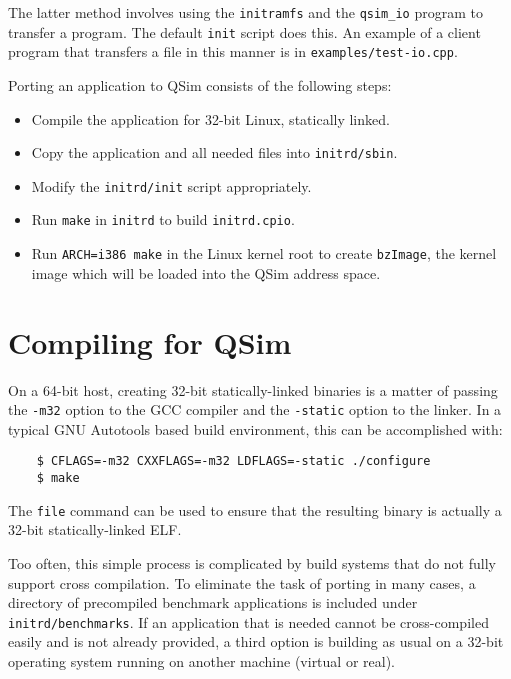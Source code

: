 \documentclass[letterpaper, 10pt]{book}
\begin{document}
The latter method involves using the \texttt{initramfs} and the
\texttt{qsim\_io} program to transfer a program. The default \texttt{init}
script does this. An example of a client program that transfers a file in this
manner is in \texttt{examples/test-io.cpp}.

Porting an application to QSim consists of the following steps:

\begin{itemize}
  \item{Compile the application for 32-bit Linux, statically linked.}
  \item{Copy the application and all needed files into \texttt{initrd/sbin}.}
  \item{Modify the \texttt{initrd/init} script appropriately.}
  \item{Run \texttt{make} in \texttt{initrd} to build \texttt{initrd.cpio}.}
  \item{Run \texttt{ARCH=i386 make} in the Linux kernel root to create 
        \texttt{bzImage}, the kernel image which will be loaded into the QSim
        address space.}
\end{itemize}

\section{Compiling for QSim}
On a 64-bit host, creating 32-bit statically-linked binaries is a matter of 
passing the \texttt{-m32} option to the GCC compiler and the \texttt{-static}
option to the linker. In a typical GNU Autotools based build environment, this
can be accomplished with:

\begin{verbatim}
    $ CFLAGS=-m32 CXXFLAGS=-m32 LDFLAGS=-static ./configure
    $ make
\end{verbatim}

The \texttt{file} command can be used to ensure that the resulting binary is
actually a 32-bit statically-linked ELF.

Too often, this simple process is complicated by build systems that do not
fully support cross compilation. To eliminate the task of porting in many
cases, a directory of precompiled benchmark applications is included under
\texttt{initrd/benchmarks}. If an application that is needed cannot be
cross-compiled easily and is not already provided, a third option is building
as usual on a 32-bit operating system running on another machine (virtual or 
real). 
\end{document}
